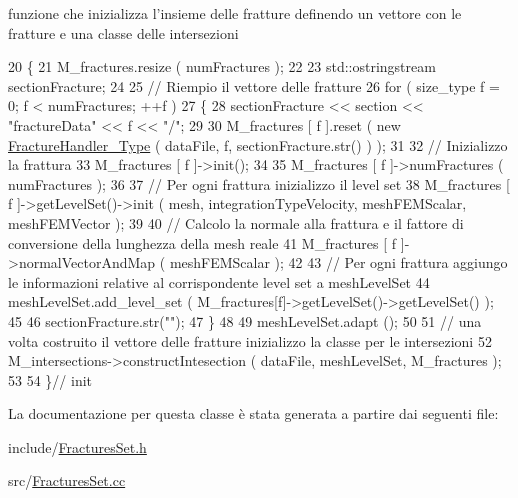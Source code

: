 funzione che inizializza l'insieme delle fratture definendo un vettore con le fratture e una classe delle intersezioni 


\begin{DoxyCode}
20 \{
21         M\_fractures.resize ( numFractures );
22 
23         std::ostringstream sectionFracture;
24 
25         \textcolor{comment}{// Riempio il vettore delle fratture}
26         \textcolor{keywordflow}{for} ( size\_type f = 0; f < numFractures; ++f )
27         \{
28                 sectionFracture << section << \textcolor{stringliteral}{"fractureData"} << f << \textcolor{stringliteral}{"/"};
29 
30                 M\_fractures [ f ].reset ( \textcolor{keyword}{new} \hyperlink{classFractureHandler}{FractureHandler\_Type} ( dataFile, f, 
      sectionFracture.str() ) );
31 
32                 \textcolor{comment}{// Inizializzo la frattura  }
33                 M\_fractures [ f ]->init();
34 
35                 M\_fractures [ f ]->numFractures ( numFractures );
36 
37                 \textcolor{comment}{// Per ogni frattura inizializzo il level set}
38                 M\_fractures [ f ]->getLevelSet()->init ( mesh, integrationTypeVelocity, meshFEMScalar, 
      meshFEMVector );
39 
40                 \textcolor{comment}{// Calcolo la normale alla frattura e il fattore di conversione della lunghezza della mesh
       reale}
41                 M\_fractures [ f ]->normalVectorAndMap ( meshFEMScalar );
42 
43                 \textcolor{comment}{// Per ogni frattura aggiungo le informazioni relative al corrispondente level set a
       meshLevelSet}
44                 meshLevelSet.add\_level\_set ( M\_fractures[f]->getLevelSet()->getLevelSet() );
45 
46                 sectionFracture.str(\textcolor{stringliteral}{""});
47         \}
48 
49         meshLevelSet.adapt ();
50 
51         \textcolor{comment}{// una volta costruito il vettore delle fratture inizializzo la classe per le intersezioni}
52         M\_intersections->constructIntesection ( dataFile, meshLevelSet, M\_fractures );
53 
54 \}\textcolor{comment}{// init}
\end{DoxyCode}


La documentazione per questa classe è stata generata a partire dai seguenti file\-:\begin{DoxyCompactItemize}
\item 
include/\hyperlink{FracturesSet_8h}{Fractures\-Set.\-h}\item 
src/\hyperlink{FracturesSet_8cc}{Fractures\-Set.\-cc}\end{DoxyCompactItemize}
